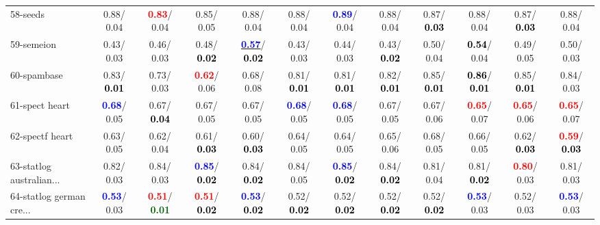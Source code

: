 \begin{table}[h]
\begin{center}
{\begin{tabular}{lc|c|c|c|c|c|c|c|c|c|c}
58-seeds &   0.88/  0.04 & \textcolor{red}{\textbf{  0.83}}/  0.04 &   0.85/  0.05 &   0.88/  0.04 &   0.88/  0.04 & \textcolor{blue}{\textbf{  0.89}}/  0.04 &   0.88/  0.04 &   0.87/\textcolor{black}{\textbf{  0.03}} &   0.88/  0.04 &   0.87/\textcolor{black}{\textbf{  0.03}} &   0.88/  0.04 \\
59-semeion &   0.43/  0.03 &   0.46/  0.03 &   0.48/\textcolor{black}{\textbf{  0.02}} & \underline{\textcolor{blue}{\textbf{  0.57}}}/\textcolor{black}{\textbf{  0.02}} &   0.43/  0.03 &   0.44/  0.03 &   0.43/\textcolor{black}{\textbf{  0.02}} &   0.50/  0.04 & \textcolor{black}{\textbf{  0.54}}/  0.04 &   0.49/  0.05 &   0.50/  0.03 \\
60-spambase &   0.83/\textcolor{black}{\textbf{  0.01}} &   0.73/  0.03 & \textcolor{red}{\textbf{  0.62}}/  0.06 &   0.68/  0.08 &   0.81/\textcolor{black}{\textbf{  0.01}} &   0.81/\textcolor{black}{\textbf{  0.01}} &   0.82/\textcolor{black}{\textbf{  0.01}} &   0.85/\textcolor{black}{\textbf{  0.01}} & \textcolor{black}{\textbf{  0.86}}/\textcolor{black}{\textbf{  0.01}} &   0.85/\textcolor{black}{\textbf{  0.01}} &   0.84/  0.03 \\ \hline
61-spect heart & \textcolor{blue}{\textbf{  0.68}}/  0.05 &   0.67/\textcolor{black}{\textbf{  0.04}} &   0.67/  0.05 &   0.67/  0.05 & \textcolor{blue}{\textbf{  0.68}}/  0.05 & \textcolor{blue}{\textbf{  0.68}}/  0.05 &   0.67/  0.05 &   0.67/  0.06 & \textcolor{red}{\textbf{  0.65}}/  0.07 & \textcolor{red}{\textbf{  0.65}}/  0.06 & \textcolor{red}{\textbf{  0.65}}/  0.07 \\
62-spectf heart &   0.63/  0.05 &   0.62/  0.04 &   0.61/\textcolor{black}{\textbf{  0.03}} &   0.60/\textcolor{black}{\textbf{  0.03}} &   0.64/  0.05 &   0.64/  0.05 &   0.65/  0.06 &   0.68/  0.05 &   0.66/  0.05 &   0.62/\textcolor{black}{\textbf{  0.03}} & \textcolor{red}{\textbf{  0.59}}/\textcolor{black}{\textbf{  0.03}} \\
63-statlog australian... &   0.82/  0.03 &   0.84/  0.03 & \textcolor{blue}{\textbf{  0.85}}/\textcolor{black}{\textbf{  0.02}} &   0.84/\textcolor{black}{\textbf{  0.02}} &   0.84/  0.05 & \textcolor{blue}{\textbf{  0.85}}/\textcolor{black}{\textbf{  0.02}} &   0.84/\textcolor{black}{\textbf{  0.02}} &   0.81/  0.04 &   0.81/\textcolor{black}{\textbf{  0.02}} & \textcolor{red}{\textbf{  0.80}}/  0.03 &   0.81/  0.03 \\
64-statlog german cre... & \textcolor{blue}{\textbf{  0.53}}/  0.03 & \textcolor{red}{\textbf{  0.51}}/\textcolor{darkgreen}{\textbf{  0.01}} & \textcolor{red}{\textbf{  0.51}}/\textcolor{black}{\textbf{  0.02}} & \textcolor{blue}{\textbf{  0.53}}/\textcolor{black}{\textbf{  0.02}} &   0.52/\textcolor{black}{\textbf{  0.02}} &   0.52/\textcolor{black}{\textbf{  0.02}} &   0.52/\textcolor{black}{\textbf{  0.02}} &   0.52/\textcolor{black}{\textbf{  0.02}} & \textcolor{blue}{\textbf{  0.53}}/  0.03 &   0.52/  0.03 & \textcolor{blue}{\textbf{  0.53}}/  0.03 \\\end{tabular}
}\label{strats1bNB}
\end{center}
\end{table}
